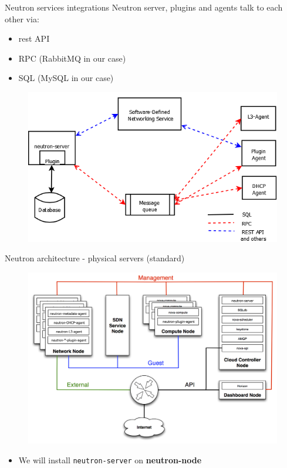 \documentclass[english,serif,mathserif,xcolor=pdftex,dvipsnames,table]{beamer}
\begin{document}
\begin{frame}{Neutron services integrations}
  Neutron server, plugins and agents talk to each other via:
  \begin{itemize}
  \item rest API
  \item RPC (RabbitMQ in our case)
  \item SQL (MySQL in our case)
  \end{itemize}
  \begin{figure}
    \centering
    \includegraphics[width=0.8\linewidth]{sdn-connections}
  \end{figure}
\end{frame}

\begin{frame}
  {Neutron architecture - physical servers (standard)}

  \begin{figure}
    \centering    
    \includegraphics[width=0.9\linewidth]{1aa-network-domains-diagram}
  \end{figure}

  \begin{itemize}
  \item We will install \texttt{neutron-server} on \textbf{neutron-node}
  \end{itemize}
\end{frame}
\end{document}
